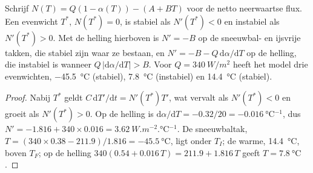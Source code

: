 \begin{proposition}\label{prop:b3:climate-models:three}
Schrijf $N(T) = Q(1 - \alpha(T)) - (A + BT)$ voor de netto neerwaartse flux. Een
evenwicht $T^*$, $N(T^*) = 0$, is stabiel als $N'(T^*) < 0$ en instabiel als
$N'(T^*) > 0$. Met de helling hierboven is $N' = -B$ op de sneeuwbal- en
ijsvrije takken, die stabiel zijn waar ze bestaan, en $N' = -B -
Q\,\mathrm d\alpha/\mathrm dT$ op de helling, die instabiel is wanneer $Q\,
|\mathrm d\alpha/\mathrm dT| > B$. Voor $Q = \qty{340}{W/m^2}$ heeft het model
drie evenwichten, \qty{-45.5}{\celsius} (stabiel), \qty{7.8}{\celsius}
(instabiel) en \qty{14.4}{\celsius} (stabiel).
\end{proposition}

\begin{proof}
Nabij $T^*$ geldt $C\,\mathrm dT'/\mathrm dt = N'(T^*)T'$, wat vervalt als
$N'(T^*) < 0$ en groeit als $N'(T^*) > 0$. Op de helling is $\mathrm d\alpha/
\mathrm dT = -0.32/20 = \qty{-0.016}{\celsius^{-1}}$, dus $N' = -1.816 + 340
\times 0.016 = \qty{+3.62}{W.m^{-2}.\celsius^{-1}}$. De sneeuwbaltak,
$T = (340\times0.38 - 211.9)/1.816 = \qty{-45.5}{\celsius}$, ligt onder
$T_I$; de warme, \qty{14.4}{\celsius}, boven $T_F$; op de helling
$340(0.54 + 0.016\,T) = 211.9 + 1.816\,T$ geeft $T = \qty{7.8}{\celsius}$.
\end{proof}

